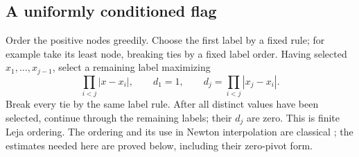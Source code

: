 \documentclass[11pt]{amsart}
\theoremstyle{definition}\newtheorem{definition}[theorem]{Definition}
\theoremstyle{remark}\newtheorem{remark}[theorem]{Remark}
\begin{document}
\subsection{A uniformly conditioned flag}
Order the positive nodes greedily. Choose the first label by a fixed rule;
for example take its least node, breaking ties by a fixed label order.
Having selected $x_1,\ldots,x_{j-1}$, select a remaining label maximizing
\[
 \prod_{i<j}|x-x_i|,
 \qquad d_1=1,\qquad d_j=\prod_{i<j}|x_j-x_i|.
\]
Break every tie by the same label rule. After all distinct values have
been selected, continue through the remaining labels; their $d_j$ are
zero. This is finite Leja ordering. The ordering and its use in Newton
interpolation are classical \cite{Leja,BosEtAl}; the estimates needed
here are proved below, including their zero-pivot form.
\end{document}
